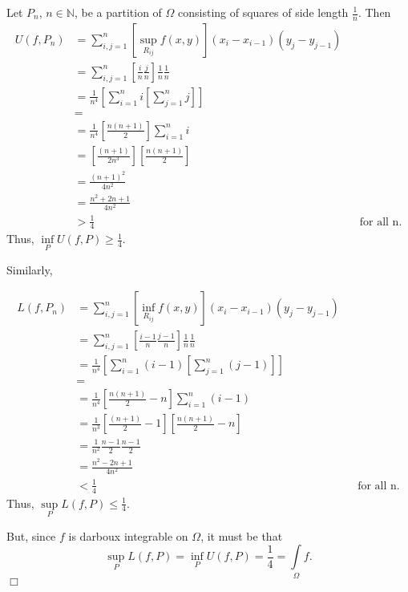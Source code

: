 \documentclass[11pt]{article}
\begin{document}
\vspace{.2in}
 
\noindent Let $P_n$, $n\in\mathbb{N}$, be a partition of $\Omega$ consisting of squares of side length $\frac{1}{n}$. Then
\begin{align*}
U(f,P_n)&=\sum\limits_{i,j=1}^n\left[\sup\limits_{R_{ij}}f(x,y)\right]\left(x_i-x_{i-1}\right)\left(y_j-y_{j-1}\right)\\&=\sum\limits_{i,j=1}^n\left[\frac{i}{n}\frac{j}{n}\right]\frac{1}{n}\frac{1}{n}\\&=\frac{1}{n^4}\left[\sum\limits_{i=1}^ni\left[\sum\limits_{j=1}^nj\right]\right]\\&=\\&=\frac{1}{n^4}\left[\frac{n(n+1)}{2}\right]\sum\limits_{i=1}^ni\\&=\left[\frac{(n+1)}{2n^3}\right]\left[\frac{n(n+1)}{2}\right]\\&=\frac{(n+1)^2}{4n^2}\\&=\frac{n^2+2n+1}{4n^2}\\&>\frac{1}{4}&&\text{for all n.}
\end{align*}
\noindent Thus, $\inf\limits_PU(f,P)\geq \frac{1}{4}$.

\vspace{.2in}

\noindent Similarly,

\begin{align*}
L(f,P_n)&=\sum\limits_{i,j=1}^n\left[\inf\limits_{R_{ij}}f(x,y)\right]\left(x_i-x_{i-1}\right)\left(y_j-y_{j-1}\right)\\&=\sum\limits_{i,j=1}^n\left[\frac{i-1}{n}\frac{j-1}{n}\right]\frac{1}{n}\frac{1}{n}\\&=\frac{1}{n^4}\left[\sum\limits_{i=1}^n(i-1)\left[\sum\limits_{j=1}^n(j-1)\right]\right]\\&=\\&=\frac{1}{n^4}\left[\frac{n(n+1)}{2}-n\right]\sum\limits_{i=1}^n(i-1)\\&=\frac{1}{n^3}\left[\frac{(n+1)}{2}-1\right]\left[\frac{n(n+1)}{2}-n\right]\\&=\frac{1}{n^2}\frac{n-1}{2}\frac{n-1}{2}\\&=\frac{n^2-2n+1}{4n^2}\\&<\frac{1}{4}&&\text{for all n.}
\end{align*}
\noindent Thus, $\sup\limits_PL(f,P)\leq\frac{1}{4}$.
\vspace{.2in}

\noindent But, since $f$ is darboux integrable on $\Omega$, it must be that
\[
\sup\limits_PL(f,P)=\inf\limits_PU(f,P)=\frac{1}{4}=\int\limits_\Omega f.
\]
\hfill	$\Box$
\end{document}
